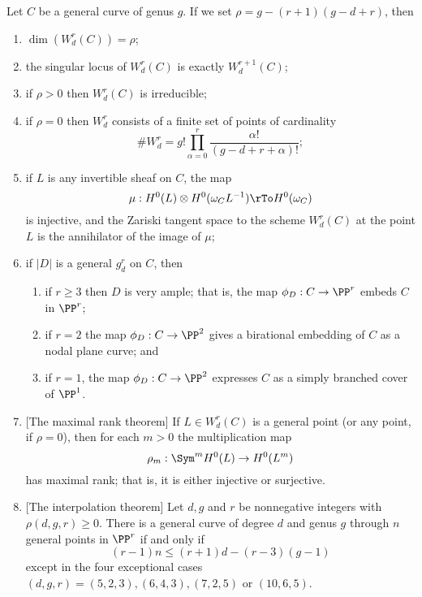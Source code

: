 \begin{theorem}\label{BN omnibus}
Let $C$ be a general curve of genus $g$. If we set $\rho = g - (r+1)(g-d+r)$, then
\begin{enumerate}
\item $\dim(W^r_d(C)) = \rho$;
\item\label{sing wrd} the singular locus of $W^r_d(C)$ is exactly $W^{r+1}_d(C)$;
\item\label{irr wrd} if $\rho > 0$ then $W^r_d(C)$ is irreducible;
\item\label{rho=0} if $\rho = 0$ then $W^r_d$ consists of a finite set of  points of cardinality
$$
\#W^r_d = g! \prod_{\alpha=0}^r \frac{\alpha!}{(g-d+r+\alpha)!};
$$
\item\label{Petri} if $L$ is any invertible sheaf on $C$, the map
$$
\mu : H^0(L) \otimes H^0(\omega_CL^{-1}) \rTo H^0(\omega_C)
$$
is injective, and the Zariski tangent space to the scheme $W^r_d(C)$ at the point $L$ is the annihilator of the image of $\mu$;
\item\label{general va} if $|D|$ is a general $g^r_d$ on $C$, then
\begin{enumerate}
\item if $r \geq 3$ then $D$ is very ample; that is, the map $\phi_D : C \to \PP^r$   embeds $C$ in $\PP^r$;
\item if $r=2$ the map $\phi_D : C \to \PP^2$ gives a birational embedding of $C$ as a nodal plane curve; and 
\item if $r=1$, the map $\phi_D : C \to \PP^2$ expresses $C$ as a simply branched cover of $\PP^1$.
\end{enumerate}

\item\label{maximal rank}[The maximal rank theorem] If $L \in W^r_d(C)$ is a general point (or any point, if $\rho = 0$), then for each $m > 0$ the multiplication map
$$
\rho_m : \Sym^m H^0(L) \to H^0(L^m)
$$
has maximal rank; that is, it is either injective or surjective.
\item\label{interpolation}[The interpolation theorem]
Let $d, g$ and $r$
be nonnegative integers with $\rho(d, g, r) \geq 0$. There is a general curve of degree $d$ and genus $g$ through $n$ general
points in $\PP^r$
if and only if
$$
(r-1)n \leq (r + 1)d-(r-3)(g-1)
$$
except in the four exceptional cases $(d, g, r) = (5, 2, 3),(6, 4, 3),(7, 2, 5)$ or $(10, 6, 5)$.
\end{enumerate}


\end{theorem}

